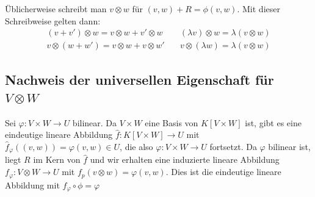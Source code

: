Üblicherweise schreibt man $v \otimes w$ für $(v,w) + R = \phi(v,w)$. Mit dieser Schreibweise gelten dann:
\[
	\begin{array}{cc}
		(v+v') \otimes w = v \otimes w + v' \otimes w & \quad (\lambda v) \otimes w = \lambda (v \otimes w) \\
		v \otimes (w+w') = v \otimes w + v \otimes w' & \quad v \otimes (\lambda w) = \lambda (v \otimes w)
	\end{array}
\]

\subsection{Nachweis der universellen Eigenschaft für $V \otimes W$} %
\label{sub:108}
Sei $\varphi : V \times W \to U$ bilinear. Da $V \times W$ eine Basis von $K[V \times W]$ ist, gibt es eine eindeutige lineare Abbildung 
$\hat f : K[V \times W] \to U$ mit $\hat f_\varphi ( (v,w)) = \varphi(v,w) \in U$, die also $\varphi : V \times W \to U$ fortsetzt. 
Da $\varphi$ bilinear ist, liegt $R$ im Kern von $\hat f$ und wir erhalten eine
induzierte lineare Abbildung $f_\varphi : V \otimes W \to U$ mit $f_p (v \otimes w) = \varphi(v,w)$. Dies ist die eindeutige lineare Abbildung mit 
$f_\varphi \circ \phi = \varphi$ \bewende 

